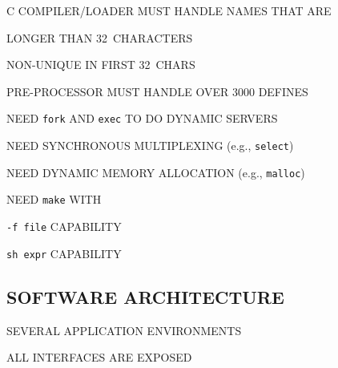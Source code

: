 \begin{bwslide}

\begin{nrtc}
\item	C COMPILER/LOADER MUST HANDLE NAMES THAT ARE
    \begin{nrtc}
    \item	LONGER THAN 32~CHARACTERS

    \item	NON-UNIQUE IN FIRST 32~CHARS

    \item	PRE-PROCESSOR MUST HANDLE OVER 3000 DEFINES
    \end{nrtc}

\item	NEED \verb"fork" AND \verb"exec" TO DO DYNAMIC SERVERS

\item	NEED SYNCHRONOUS MULTIPLEXING (e.g., \verb"select")

\item	NEED DYNAMIC MEMORY ALLOCATION (e.g., \verb"malloc")

\item	NEED \verb"make" WITH
    \begin{nrtc}
    \item	\verb"-f file" CAPABILITY

    \item	\verb"sh expr" CAPABILITY
    \end{nrtc}
\end{nrtc}
\end{bwslide}


\begin{bwslide}
\part*	{SOFTWARE ARCHITECTURE}\bf

\begin{nrtc}
\item	SEVERAL APPLICATION ENVIRONMENTS

\item	ALL INTERFACES ARE EXPOSED
\end{nrtc}
\end{bwslide}




